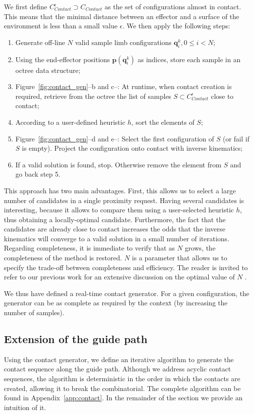 We first define $C_{Contact}^{\epsilon} \supset C_{Contact}$ as the set of configurations almost in contact. This means that the minimal distance 
between an effector and a surface of the environment is less than a small value $\epsilon$.
We then apply the following steps:
\begin{enumerate}
\item Generate off-line $N$ valid sample limb configurations $\mathbf{q}^k_i,  0 \leq i < N$;
\item Using the end-effector positions $\mathbf{p}(\mathbf{q}^k_i)$ as indices, store each sample in an octree data structure;
\item Figure~\ref{fig:contact_gen}--b and c--: At runtime, when contact creation is required, retrieve from the octree the list of samples $S \subset C_{Contact}^{\epsilon}$ close to contact;
\item According to a user-defined heuristic $h$, sort the elements of $S$;
\item Figure~\ref{fig:contact_gen}--d and e--: Select the first configuration of $S$ (or fail if $S$ is empty). Project the configuration onto contact with inverse kinematics;
\item If a valid solution is found, stop. Otherwise remove the element from $S$ and go back step 5.
\end{enumerate}

This approach has two main advantages.
First, this allows us to select a large number of candidates in a single proximity request.
Having several candidates is interesting, because it allows to compare them using a user-selected heuristic $h$, thus obtaining
a locally-optimal candidate.
Furthermore, the fact that the candidates are already close to contact increases the odds that the inverse kinematics will converge to a valid solution in a small number of iterations.
Regarding completeness, it is immediate to verify that as $N$ grows, the completeness of the method is restored.
$N$ is a parameter that allows us to specify the trade-off between completeness and efficiency.
The reader is invited to refer to our previous work for an extensive discussion on the optimal value of $N$ \citep{Tonneau2014}.

We thus have defined a real-time contact generator. For a given configuration, the generator can be as complete as required by the context (by increasing the number of samples).

\subsection{Extension of the guide path}
Using the contact generator, we define an iterative algorithm to generate the contact
sequence along the guide path.
Although we address acyclic contact sequences, the algorithm is deterministic in the order in which 
the contacts are created, allowing it to break the combinatorial.
The complete algorithm can be found in Appendix~\ref{app:contact}.
In the remainder of the section we provide an intuition of it.

